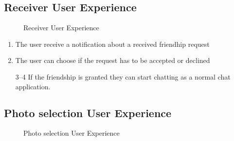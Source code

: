 \subsection{Receiver User Experience}

\begin{figure}[H]
\caption{Receiver User Experience}
\end{figure}

\begin{enumerate}
\item The user receive a notification about a received friendhip request 

\item The user can choose if the request has to be accepted or declined


\item[3--4] If the friendship is granted they can start chatting as a normal chat application.
\end{enumerate}

\newpage

\subsection{Photo selection User Experience}

\begin{figure}[H]
\caption{Photo selection User Experience}
\end{figure}

